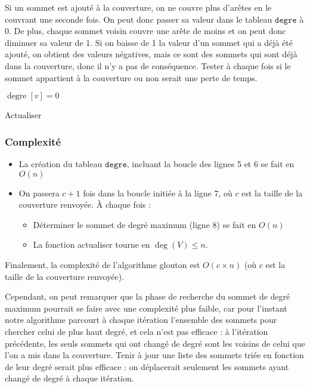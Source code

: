 \documentclass[a4paper,10pt]{article}
\newcommand*{\itemb}{\item[$\bullet$]}
\newcommand*{\itemt}{\item[$\blacktriangleright$]}
\DeclareMathOperator{\degree}{degre}
\DeclareMathOperator{\voisin}{voisin}
\begin{document}
\vspace{0.35cm}
Si un sommet est ajouté à la couverture, on ne couvre plus d'arêtes en le couvrant une seconde fois. On peut donc passer sa valeur dans le tableau $\mathtt{degre}$ à 0. De plus, chaque sommet voisin couvre une arête de moins et on peut donc diminuer sa valeur de 1. Si on baisse de 1 la valeur d'un sommet qui a déjà été ajouté, on obtient des valeurs négatives, mais ce sont des sommets qui sont déjà dans la couverture, donc il n'y a pas de conséquence. Tester à chaque fois si le sommet appartient à la couverture ou non serait une perte de temps.

\vspace{0.35cm}
\begin{algorithm}[H]

\BlankLine
$\degree[v]=0$

\Pour{$i\in \voisin[v]$}{

décrémenter $\voisin[i]$ de 1
}
\caption{Actualiser}
 
\end{algorithm}

\subsubsection{Complexité}

\begin{itemize}
 \itemb La création du tableau $\mathtt{degre}$, incluant la boucle des lignes 5 et 6 se fait en $O(n)$
 \itemb On passera $c+1$ fois dans la boucle initiée à la ligne 7, où $c$ est la taille de la couverture renvoyée. À chaque fois :
\begin{itemize}
\itemt Déterminer le sommet de degré maximum (ligne 8) se fait en $O(n)$
\itemt La fonction actualiser tourne en $\deg(V)\leqslant n$.
\end{itemize}
\end{itemize}

Finalement, la complexité de l'algorithme glouton est $O(c\times n)$ (où $c$ est la taille de la couverture renvoyée).

Cependant, on peut remarquer que la phase de recherche du sommet de degré maximum pourrait se faire avec une complexité plus faible, car pour l'instant notre algorithme parcourt à chaque itération l'ensemble des sommets pour chercher celui de plus haut degré, et cela n'est pas efficace : à l'itération précédente, les seuls sommets qui ont changé de degré sont les voisins de celui que l'on a mis dans la couverture. Tenir à jour une liste des sommets triée en fonction de leur degré serait plus efficace : on déplacerait seulement les sommets ayant changé de degré à chaque itération.
\end{document}
